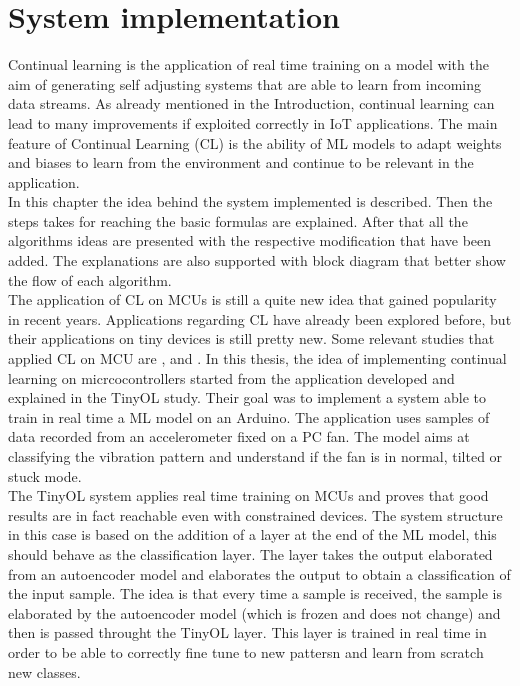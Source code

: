 \documentclass[12pt]{report}
\begin{document}
\chapter{System implementation}
Continual learning is the application of real time training on a model with the aim of generating self adjusting systems that are able to learn from incoming data streams. As already mentioned in the Introduction, continual learning can lead to many improvements if exploited correctly in IoT applications. The main feature of Continual Learning (CL) is the ability of ML models to adapt weights and biases to learn from the environment and continue to be relevant in the application. \\
In this chapter the idea behind the system implemented is described. Then the steps takes for reaching the basic formulas are explained. After that all the algorithms ideas are presented with the respective modification that have been added. The explanations are also supported with block diagram that better show the flow of each algorithm.\\
The application of CL on MCUs is still a quite new idea that gained popularity in recent years. Applications regarding CL have already been explored before, but their applications on tiny devices is still pretty new. Some relevant studies that applied CL on MCU are \autocite{ren2021tinyol}, \autocite{ren2021synergy} and \autocite{sudharsan2021train++}. In this thesis, the idea of implementing continual learning on micrcocontrollers started from the application developed and explained in the TinyOL study. Their goal was to implement a system able to train in real time a ML model on an Arduino. The application uses samples of data recorded from an accelerometer fixed on a PC fan. The model aims at classifying the vibration pattern and understand if the fan is in normal, tilted or stuck mode.\\
The TinyOL system applies real time training on MCUs and proves that good results are in fact reachable even with constrained devices. The system structure in this case is based on the addition of a layer at the end of the ML model, this should behave as the classification layer. The layer takes the output elaborated from an autoencoder model and elaborates the output to obtain a classification of the input sample. The idea is that every time a sample is received, the sample is elaborated by the autoencoder model (which is frozen and does not change) and then is passed throught the TinyOL layer. This layer is trained in real time in order to be able to correctly fine tune to new pattersn and learn from scratch new classes.\\
\end{document}
